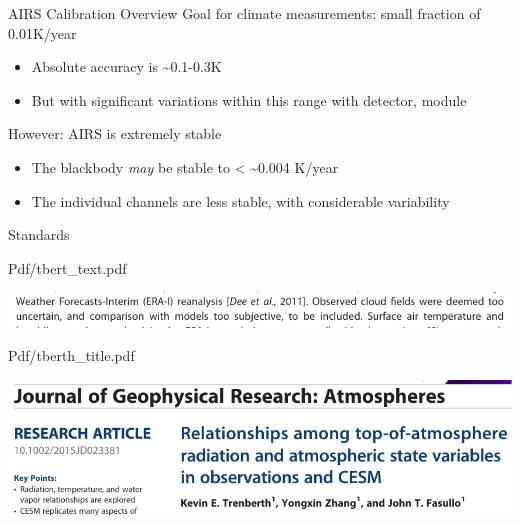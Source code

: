 \documentclass[presentation]{beamer}
\begin{document}
\begin{frame}[label={sec:orga23880b}]{AIRS Calibration Overview}
Goal for climate measurements: small fraction of 0.01K/year

\begin{itemize}
\item Absolute accuracy is \textasciitilde{}0.1-0.3K
\item But with significant variations within this range with detector, module
\end{itemize}


However:  AIRS is extremely stable
\begin{itemize}
\item The blackbody \emph{may} be stable to < \textasciitilde{}0.004 K/year
\item The individual channels are less stable, with considerable variability
\end{itemize}
\end{frame}



\begin{frame}[label={sec:orgfcdecf7}]{Standards}
\end{frame}

\begin{frame}[label={sec:orgaf2ca7a}]{Pdf/tbert\_text.pdf}
\begin{center}
\includegraphics[width=0.7\linewidth]{./Figs/Pdf/tbert_text.pdf}
\end{center}
\end{frame}

\begin{frame}[label={sec:orgcce4971}]{Pdf/tberth\_title.pdf}
\begin{center}
\includegraphics[width=0.7\linewidth]{./Figs/Pdf/tberth_title.pdf}
\end{center}
\end{frame}
\end{document}
